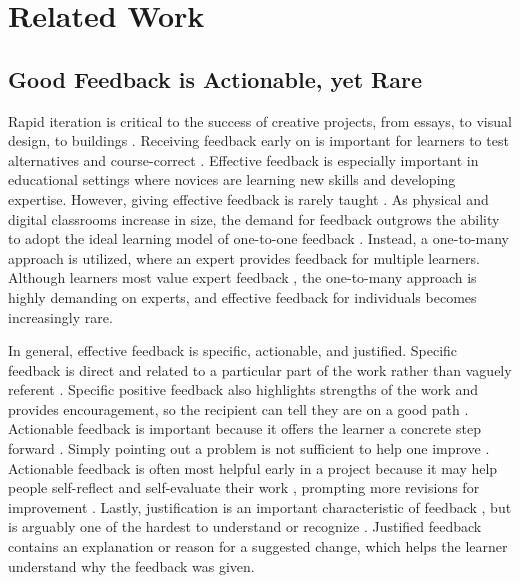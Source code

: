 \section{Related Work}
\subsection{Good Feedback is Actionable, yet Rare}
Rapid iteration is critical to the success of creative projects, from essays, to visual design, to buildings \cite{Dow2010, sadler1989formative}. Receiving feedback early on is important for learners to test alternatives and course-correct \cite{Dow2010, tohidi2006getting}. Effective feedback is especially important in educational settings where novices are learning new skills and developing expertise. However, giving effective feedback is rarely taught \cite{Nicol2006}. As physical and digital classrooms increase in size, the demand for feedback outgrows the ability to adopt the ideal learning model of one-to-one feedback \cite{bloom1984}. Instead, a one-to-many approach is utilized, where an expert provides feedback for multiple learners. Although learners most value expert feedback \cite{Gielen2010, Yang2006}, the one-to-many approach is highly demanding on experts, and effective feedback for individuals becomes increasingly rare. 

In general, effective feedback is specific, actionable, and justified. Specific feedback is direct and related to a particular part of the work rather than vaguely referent \cite{Krause2017, sadler1989formative, yuan2016}. Specific positive feedback also highlights strengths of the work and provides encouragement, so the recipient can tell they are on a good path \cite{Kelley2013, Tseng2007, yuan2016}. Actionable feedback is important because it offers the learner a concrete step forward \cite{sadler1989formative, sommers1980revision, Tseng2007, yuan2016}. Simply pointing out a problem is not sufficient to help one improve \cite{Ramaprasad1983, sadler1989formative, sommers1980revision, tohidi2006getting}. Actionable feedback is often most helpful early in a project \cite{Cho2006, Tseng2007, yuan2016} because it may help people self-reflect and self-evaluate their work \cite{Gibbs}, prompting more revisions for improvement \cite{Dow2012, Topping1998}. Lastly, justification is an important characteristic of feedback \cite{Krause2017, Narciss2006, yuan2016}, but is arguably one of the hardest to understand or recognize \cite{Gielen2010}. Justified feedback contains an explanation or reason for a suggested change, which helps the learner understand why the feedback was given.

